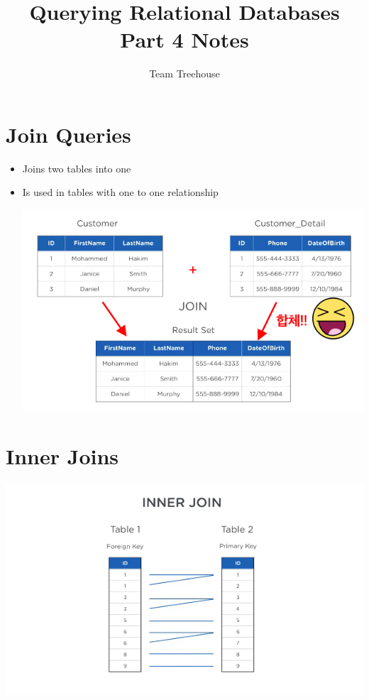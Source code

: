 \documentclass[12pt]{article}
\begin{document}
\title{Querying Relational Databases Part 4 Notes}
\author{Team Treehouse}
\maketitle

\bigskip

\section{Join Queries}

\bigskip

\begin{itemize}
    \item Joins two tables into one
    \item Is used in tables with one to one relationship

    \begin{center}
    \includegraphics[width=0.8\linewidth]{images/part_4_notes_1.png}
    \end{center}
\end{itemize}

\bigskip

\section{Inner Joins}

\begin{center}
\includegraphics[width=\linewidth]{images/part_4_notes_3.png}
\end{center}
\end{document}
